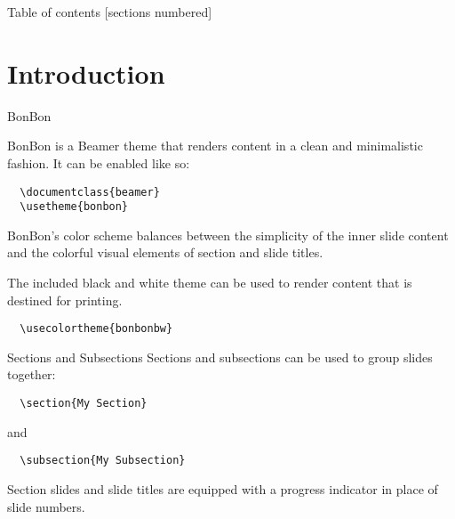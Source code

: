 \documentclass{beamer} %
\title{\bonbon}
\subtitle{A minimalistic theme for Beamer}
\author{Duncan Paul Attard}
\date{\today}
\newcommand*{\bonbon}{BonBon\xspace}
\begin{document}
\maketitle

\begin{frame}{Table of contents}
  [sections numbered]
  \tableofcontents[hideallsubsections]
\end{frame}

\section{Introduction}

\begin{frame}[fragile]{\bonbon}


  \bonbon is a Beamer theme that renders content in a clean and
  minimalistic fashion.
  It can be enabled like so:
  \begin{verbatim}  \documentclass{beamer}
  \usetheme{bonbon}\end{verbatim}

  \bonbon's color scheme balances between the simplicity of the inner slide
  content and the colorful visual elements of section and slide titles.

  \bigskip
  The included black and white theme can be used to render content that is
  destined for printing.
  \begin{verbatim}  \usecolortheme{bonbonbw}\end{verbatim}

\end{frame}

\begin{frame}[fragile]{Sections and Subsections}
  Sections and subsections can be used to group slides together:
  \begin{verbatim}  \section{My Section}  \end{verbatim}
  and
  \begin{verbatim}  \subsection{My Subsection}  \end{verbatim}

  Section slides and slide titles are equipped with a progress indicator
  in place of slide numbers.
\end{frame}
\end{document}
